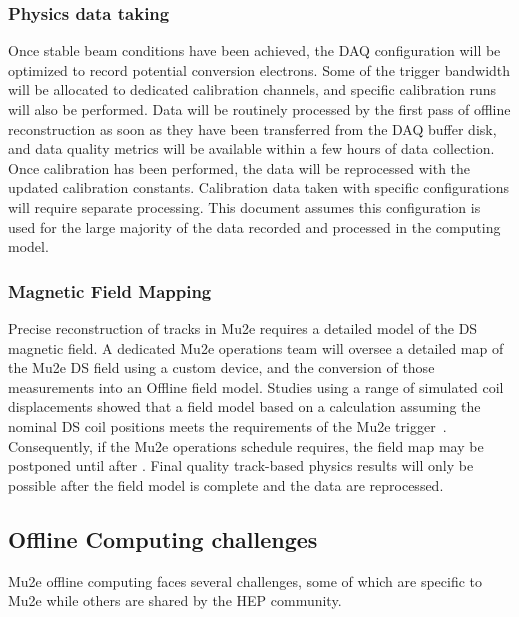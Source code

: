 \subsubsection{Physics data taking }
Once stable beam conditions have been achieved, the DAQ configuration will be optimized to record potential conversion electrons. Some of the trigger bandwidth will be allocated to dedicated calibration channels, and specific calibration runs will also be performed. Data will be routinely processed by the first pass of offline reconstruction as soon as they have been transferred from the DAQ buffer disk, and data quality metrics will be available within a few hours of data collection. Once calibration has been performed, the data will be reprocessed with the updated calibration constants. Calibration data taken with specific configurations will require separate processing. This document assumes this configuration is used for the large majority of the data recorded and processed in the computing model.

\subsubsection{ Magnetic Field Mapping }
Precise reconstruction of tracks in Mu2e requires a detailed model of the DS magnetic field. A dedicated Mu2e operations team will oversee a detailed map of the Mu2e DS field using a custom device, and the conversion of those measurements into an Offline field model. Studies using a range of simulated coil displacements showed that a field model based on a calculation assuming the nominal DS coil positions meets the requirements of the Mu2e trigger~\cite{docdb46856}. Consequently, if the Mu2e operations schedule requires, the field map may be postponed until after \runone. Final quality track-based physics results will only be possible after the field model is complete and the data are reprocessed.

\subsection{Offline Computing challenges}

Mu2e offline computing faces several challenges, some of which are specific to Mu2e while others are shared by the HEP community.

